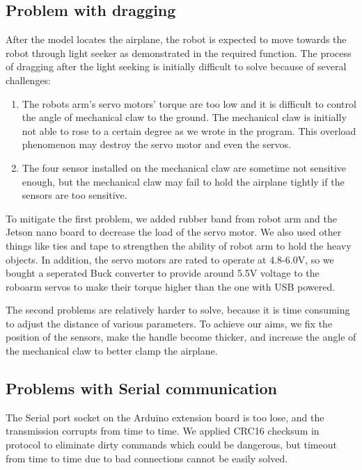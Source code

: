 {\subsection{Problem with dragging}{
After the model locates the airplane, the robot is expected to move towards the robot through light seeker as demonstrated in the required function. The process of dragging after the light seeking is initially difficult to solve because of several challenges: 
\begin{enumerate}
    \item 
    The robots arm's servo motors' torque are too low and it is difficult to control the angle of mechanical claw to the ground. The mechanical claw is initially not able to rose to a certain degree as we wrote in the program. This overload phenomenon may destroy the servo motor and even the servos.
    \item 
    The four sensor installed on the mechanical claw are sometime not sensitive enough, but the mechanical claw may fail to hold the airplane tightly if the sensors are too sensitive.
\end{enumerate}
To mitigate the first problem, we added rubber band from robot arm and the Jetson nano board to decrease the load of the servo motor. We also used other things like ties and tape to strengthen the ability of robot arm to hold the heavy objects. In addition, the servo motors are rated to operate at 4.8-6.0V, so we bought a seperated Buck converter to provide around 5.5V voltage to the roboarm servos to make their torque higher than the one with USB powered.

The second problems are relatively harder to solve, because it is time consuming to adjust the distance of various parameters. To achieve our aims, we fix the position of the sensors, make the handle become thicker, and increase the angle of the mechanical claw to better clamp the airplane.  

}
\subsection{Problems with Serial communication}
    The Serial port socket on the Arduino extension board is too lose, and the transmission corrupts from time to time. We applied CRC16 checksum in protocol to eliminate dirty commands which could be dangerous, but timeout from time to time due to bad connections cannot be easily solved.
}

